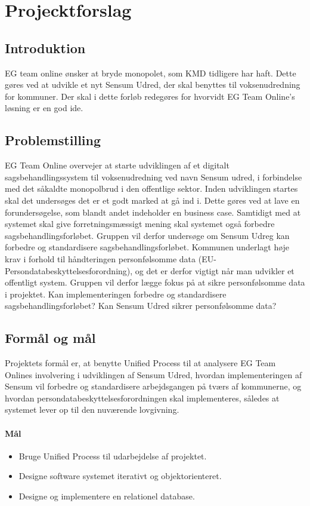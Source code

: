 \documentclass[../../main.tex]{subfiles}
\begin{document}
\section{Projecktforslag}
\subsection{Introduktion}
EG team online ønsker at bryde monopolet, som KMD tidligere har haft.
Dette gøres ved at udvikle et nyt Sensum Udred, der skal benyttes til voksenudredning for kommuner.
Der skal i dette forløb redegøres for hvorvidt EG Team Online’s løsning er en god ide.

\subsection{Problemstilling}
EG Team Online overvejer at starte udviklingen af et digitalt sagsbehandlingssystem
til voksenudredning ved navn Sensum udred, i forbindelse med det såkaldte
monopolbrud i den offentlige sektor. Inden udviklingen startes skal det undersøges
det er et godt marked at gå ind i. Dette gøres ved at lave en forundersøgelse, som
blandt andet indeholder en business case. Samtidigt med at systemet skal give
forretningsmæssigt mening skal systemet også forbedre sagsbehandlingsforløbet.
Gruppen vil derfor undersøge om Sensum Udreg kan forbedre og standardisere
sagsbehandlingsforløbet.
Kommunen underlagt høje krav i forhold til håndteringen personfølsomme
data (EU-Persondatabeskyttelsesforordning), og det er derfor vigtigt når man
udvikler et offentligt system. Gruppen vil derfor lægge fokus på at sikre
personfølsomme data i projektet. Kan implementeringen forbedre og standardisere
sagsbehandlingsforløbet? Kan Sensum Udred sikrer personfølsomme data?

\subsection{Formål og mål}
Projektets formål er, at benytte Unified Process til at analysere EG Team Onlines
involvering i udviklingen af Sensum Udred, hvordan implementeringen af
Sensum vil forbedre og standardisere arbejdsgangen på tværs af kommunerne, og
hvordan persondatabeskyttelsesforordningen skal implementeres, således at systemet
lever op til den nuværende lovgivning.

\paragraph{Mål}
\begin{itemize}
  \item Bruge Unified Process til udarbejdelse af projektet.
  \item Designe software systemet iterativt og objektorienteret.
  \item Designe og implementere en relationel database.
\end{itemize}
\end{document}
